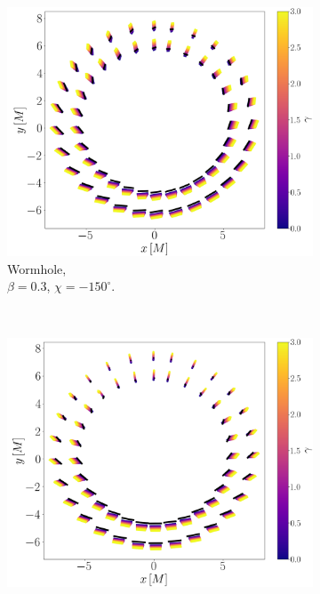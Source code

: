 \documentclass[12pt]{article}
\numberwithin{equation}{section}
\numberwithin{figure}{section}
\begin{document}
	
	\begin{figure}[!htb]
		\begin{subfigure}{7cm}
			\hspace{0.0em}
			\includegraphics[scale = 0.23]{Section_7_Polarized_Emission/WH_alpha_Vert_Field.png}
			\caption{Wormhole, \\$\beta = 0.3$, $\chi = -150^\circ$.} 
		\end{subfigure}\,\,\,
		\begin{subfigure}{7cm}
			\hspace{0.2em}
			\includegraphics[scale = 0.23]{Section_7_Polarized_Emission/WH_alpha_Vert_Field_beta_zero.png}

\end{subfigure}
\end{figure}
\end{document}

